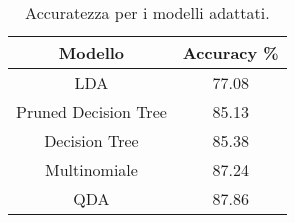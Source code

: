 \begin{table}[H]
\centering\caption{Accuratezza per i modelli adattati.}
\begin{tabular}{cc}
\toprule
              Modello &  Accuracy \% \\
\midrule
                  LDA &       77.08 \\
 Pruned Decision Tree &       85.13 \\
        Decision Tree &       85.38 \\
         Multinomiale &       87.24 \\
                  QDA &       87.86 \\
\bottomrule
\end{tabular}
\end{table}